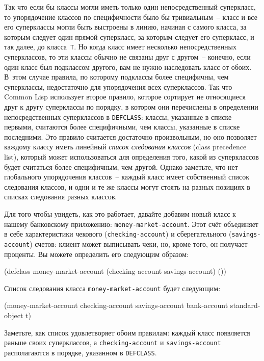 Так что если бы классы могли иметь только один непосредственный суперкласс, то
упорядочение классов по специфичности было бы тривиальным~-- класс и все его суперклассы
могли быть выстроены в линию, начиная с самого класса, за которым следует один прямой
суперкласс, за которым следует его суперкласс, и так далее, до класса~\lstinline{T}.  Но
когда класс имеет несколько непосредственных суперклассов, то эти классы обычно не связаны
друг с другом~-- конечно, если один класс был подклассом другого, вам не нужно наследовать
класс от обоих.  В~этом случае правила, по которому подклассы более специфичны, чем
суперклассы, недостаточно для упорядочения всех суперклассов.  Так что Common Lisp
использует второе правило, которое сортирует не относящиеся друг к другу суперклассы по
порядку, в котором они перечислены в определении непосредственных суперклассов в
\lstinline{DEFCLASS}: классы, указанные в списке первыми, считаются более специфичными,
чем классы, указанные в списке последними.  Это правило считается достаточно произвольным,
но оно позволяет каждому классу иметь линейный \textit{список следования классов} (class
precedence list), который может использоваться для определения того, какой из суперклассов
будет считаться более специфичным, чем другой.  Однако заметьте, что нет глобального
упорядочения классов~-- каждый класс имеет собственный список следования классов, и одни и
те же классы могут стоять на разных позициях в списках следования разных классов.

Для того чтобы увидеть, как это работает, давайте добавим новый класс к нашему банковскому
приложению: \lstinline{money-market-account}.  Этот счёт объединяет в себе характеристики
чекового (\lstinline{checking-account}) и сберегательного (\lstinline{savings-account}) счетов:
клиент может выписывать чеки, но, кроме того, он получает проценты.  Вы можете определить
его следующим образом:

\begin{myverb}
(defclass money-market-account (checking-account savings-account) ())
\end{myverb}

Список следования класса \lstinline{money-market-account} будет следующим:

\begin{myverb}
(money-market-account
 checking-account
 savings-account
 bank-account
 standard-object
 t)
\end{myverb}

Заметьте, как список удовлетворяет обоим правилам: каждый класс появляется раньше своих
суперклассов, а \lstinline{checking-account} и \lstinline{savings-account} располагаются в порядке,
указанном в \lstinline{DEFCLASS}.

